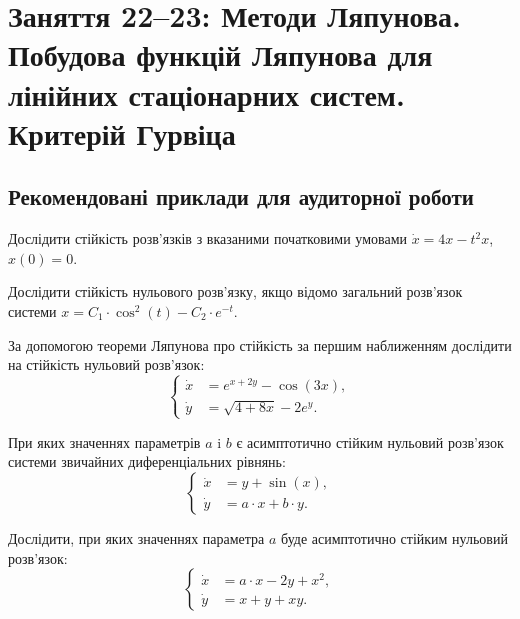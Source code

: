 \section*{Заняття 22--23: Методи Ляпунова. Побудова функцій Ляпунова для лінійних стаціонарних систем. Критерій Гурвіца}

\subsection*{Рекомендовані приклади для аудиторної роботи}

\begin{problem}
	Дослідити стійкість розв'язків з вказаними початковими умовами $\dot x = 4 x - t^2 x$, $x(0) = 0$.
\end{problem}

\begin{problem}
	Дослідити стійкість нульового розв'язку, якщо відомо загальний розв'язок системи $x = C_1 \cdot \cos^2 (t) - C_2 \cdot e^{-t}$.
\end{problem}

\begin{problem}
	За допомогою теореми Ляпунова про стійкість за першим наближенням дослідити на стійкість нульовий розв'язок: 
	\[\left\{ \begin{aligned} \dot x &= e^{x + 2 y} - \cos (3 x), \\ \dot y &= \sqrt{4 + 8 x} - 2 e^y. \end{aligned} \right.\]
\end{problem}

\begin{problem}
	При яких значеннях параметрів $a$ i $b$ є асимптотично стійким нульовий розв'язок системи звичайних диференціальних рівнянь: 
	\[\left\{ \begin{aligned} \dot x &= y + \sin (x), \\ \dot y &= a \cdot x + b \cdot y. \end{aligned} \right.\]
\end{problem}

\begin{problem}
	Дослідити, при яких значеннях параметра $a$ буде асимптотично стійким нульовий розв'язок: 
	\[\left\{ \begin{aligned} \dot x &= a \cdot x - 2 y + x^2, \\ \dot y &= x + y + x y. \end{aligned} \right.\]
\end{problem}

